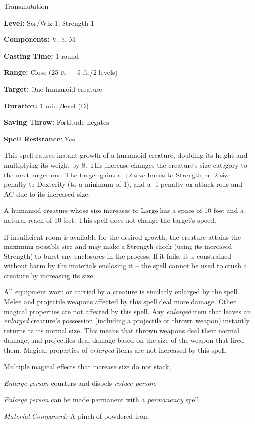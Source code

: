 
Transmutation

\textbf{Level:} Sor/Wiz 1, Strength 1

\textbf{Components:} V, S, M

\textbf{Casting Time:} 1 round

\textbf{Range:} Close (25 ft. + 5 ft./2 levels)

\textbf{Target:} One humanoid creature

\textbf{Duration:} 1 min./level (D)

\textbf{Saving Throw:} Fortitude negates

\textbf{Spell Resistance:} Yes

This spell causes instant growth of a humanoid creature, doubling its height and 
multiplying its weight by 8. This increase changes the creature's size category 
to the next larger one. The target gains a +2 size bonus to Strength, a -2 size 
penalty to Dexterity (to a minimum of 1), and a -1 penalty on attack rolls and 
AC due to its increased size.

A humanoid creature whose size increases to Large has a space of 10 feet and a 
natural reach of 10 feet. This spell does not change the target's speed.

If insufficient room is available for the desired growth, the creature attains 
the maximum possible size and may make a Strength check (using its increased Strength) 
to burst any enclosures in the process. If it fails, it is constrained without 
harm by the materials enclosing it --  the spell cannot be used to crush a creature 
by increasing its size.

All equipment worn or carried by a creature is similarly enlarged by the spell. 
Melee and projectile weapons affected by this spell deal more damage. Other magical 
properties are not affected by this spell. Any \textit{enlarged} item that leaves 
an \textit{enlarged} creature's possession (including a projectile or thrown weapon) 
instantly returns to its normal size. This means that thrown weapons deal their 
normal damage, and projectiles deal damage based on the size of the weapon that 
fired them. Magical properties of \textit{enlarged} items are not increased by 
this spell.

Multiple magical effects that increase size do not stack,.

\textit{Enlarge person} counters and dispels \textit{reduce person}.

\textit{Enlarge person} can be made permanent with a \textit{permanency} spell.

\textit{Material Component:} A pinch of powdered iron.

